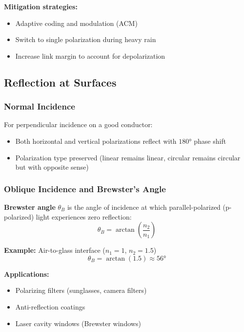 \begin{center}
\textbf{Mitigation strategies:}
\begin{itemize}
\item Adaptive coding and modulation (ACM)
\item Switch to single polarization during heavy rain
\item Increase link margin to account for depolarization
\end{itemize}

\subsection{Reflection at Surfaces}

\subsubsection{Normal Incidence}

For perpendicular incidence on a good conductor:
\begin{itemize}
\item Both horizontal and vertical polarizations reflect with $180°$ phase shift
\item Polarization type preserved (linear remains linear, circular remains circular but with opposite sense)
\end{itemize}

\subsubsection{Oblique Incidence and Brewster's Angle}

\textbf{Brewster angle} $\theta_B$ is the angle of incidence at which parallel-polarized (p-polarized) light experiences zero reflection:
\begin{equation}
\theta_B = \arctan\left(\frac{n_2}{n_1}\right)
\label{eq:brewster-angle}
\end{equation}

\textbf{Example:} Air-to-glass interface ($n_1 = 1$, $n_2 = 1.5$)
\begin{equation}
\theta_B = \arctan(1.5) \approx 56°
\label{eq:brewster-example}
\end{equation}

\textbf{Applications:}
\begin{itemize}
\item Polarizing filters (sunglasses, camera filters)
\item Anti-reflection coatings
\item Laser cavity windows (Brewster windows)
\end{itemize}


\end{center}
